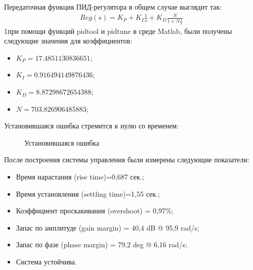 \documentclass[12pt, a4paper]{report}
\theoremstyle{definition}
\theoremstyle{plain}
\theoremstyle{remark}
\theoremstyle{remark}
\theoremstyle{definition}
\begin{document}
Передаточная функция ПИД-регулятора в общем случае выглядит так:
 \begin{align}
  Reg(s)=K_{P}+K_{I}\frac{1}{s}+K_{D}\frac{N}{1+N\frac{1}{s}}
\end{align}
1при помощи функций pidtool и
pidtune в среде Matlab, были получены следующие значения для
коэффициентов:
\begin{itemize}
  \item $K_{P}=17.4851130836651$;
  \item $K_{I}=0.916494149876436$;
  \item $K_{D}=8.87298672654388$;
  \item $N=703.826906485883$;
  
 \end{itemize}
 
 Установившаяся ошибка стремится к нулю со временем:
 \begin{figure}[h!]
    \caption{Установившаяся ошибка}
\end{figure}

После построения системы управления были измерены следующие
показатели:
\begin{itemize}
  \item Время нарастания (rise time)=0,687 сек.;
  \item Время установления (settling time)=1,55 сек.;
  \item Коэффициент проскакивания (overshoot) = 0,97\%;
  \item Запас по амплитуде (gain margin) = 40,4 dB @ 95,9 rad/s;
  \item Запас по фазе (phase margin) = 79,2 deg @ 6,16 rad/s;   
  \item Система устойчива.
 \end{itemize}
 
\end{document}
